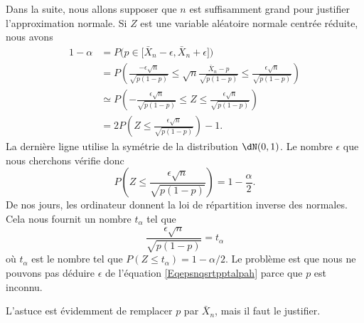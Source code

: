 Dans la suite, nous allons supposer que \( n\) est suffisamment grand pour justifier l'approximation normale. Si \( Z\) est une variable aléatoire normale centrée réduite, nous avons
\begin{subequations}
    \begin{align}
        1-\alpha&=P\big( p\in\mathopen[ \bar X_n-\epsilon , \bar X_n+\epsilon \mathclose] \big) \label{subEqumaleftLthe}\\
        &=P\left( \frac{ -\epsilon\sqrt{n} }{ \sqrt{p(1-p)} }\leq \sqrt{n}\frac{ \bar X_n-p }{ \sqrt{p(1-p)} }\leq \frac{ \epsilon\sqrt{n} }{ \sqrt{p(1-p)} } \right)\\
        &\simeq P\left( -\frac{ \epsilon\sqrt{n} }{ \sqrt{p(1-p)} }\leq Z\leq \frac{ \epsilon\sqrt{n} }{ \sqrt{p(1-p)} } \right)\\
        &=2P\left( Z\leq \frac{ \epsilon\sqrt{n} }{ \sqrt{p(1-p)} } \right)-1.
    \end{align}
\end{subequations}
La dernière ligne utilise la symétrie de la distribution \( \dN(0,1)\). Le nombre \( \epsilon\) que nous cherchons vérifie donc
\begin{equation}
    P\left( Z\leq \frac{ \epsilon\sqrt{n} }{ \sqrt{p(1-p)} } \right)=1-\frac{ \alpha }{2}.
\end{equation}
De nos jours, les ordinateur donnent la loi de répartition inverse des normales. Cela nous fournit un nombre \( t_{\alpha}\) tel que
\begin{equation}    \label{Eqepsnqsrtpptalpah}
    \frac{ \epsilon\sqrt{n} }{ \sqrt{p(1-p)} }=t_{\alpha}
\end{equation}
où \( t_{\alpha}\) est le nombre tel que \( P(Z\leq t_{\alpha})=1-\alpha/2\). Le problème est que nous ne pouvons pas déduire \( \epsilon\) de l'équation \eqref{Eqepsnqsrtpptalpah} parce que \( p\) est inconnu.

L'astuce est évidemment de remplacer \( p\) par \( \bar X_n\), mais il faut le justifier. 

